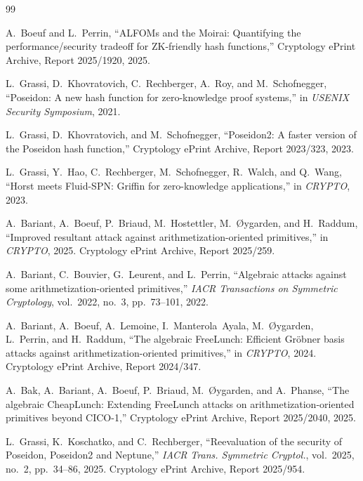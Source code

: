 \documentclass[11pt,a4paper]{article}
\theoremstyle{definition}
\begin{document}
\begin{thebibliography}{99}

A.~Boeuf and L.~Perrin,
``ALFOMs and the Moirai: Quantifying the performance/security tradeoff
for ZK-friendly hash functions,''
Cryptology ePrint Archive, Report 2025/1920, 2025.

L.~Grassi, D.~Khovratovich, C.~Rechberger, A.~Roy, and M.~Schofnegger,
``Poseidon: A new hash function for zero-knowledge proof systems,''
in \emph{USENIX Security Symposium}, 2021.

L.~Grassi, D.~Khovratovich, and M.~Schofnegger,
``Poseidon2: A faster version of the Poseidon hash function,''
Cryptology ePrint Archive, Report 2023/323, 2023.

L.~Grassi, Y.~Hao, C.~Rechberger, M.~Schofnegger, R.~Walch, and Q.~Wang,
``Horst meets Fluid-SPN: Griffin for zero-knowledge applications,''
in \emph{CRYPTO}, 2023.

A.~Bariant, A.~Boeuf, P.~Briaud, M.~Hostettler, M.~{\O}ygarden, and
H.~Raddum,
``Improved resultant attack against arithmetization-oriented
primitives,''
in \emph{CRYPTO}, 2025. Cryptology ePrint Archive, Report 2025/259.

A.~Bariant, C.~Bouvier, G.~Leurent, and L.~Perrin,
``Algebraic attacks against some arithmetization-oriented primitives,''
\emph{IACR Transactions on Symmetric Cryptology}, vol.~2022, no.~3,
pp.~73--101, 2022.

A.~Bariant, A.~Boeuf, A.~Lemoine, I.~Manterola~Ayala, M.~{\O}ygarden,
L.~Perrin, and H.~Raddum,
``The algebraic FreeLunch: Efficient Gr\"obner basis attacks against
arithmetization-oriented primitives,''
in \emph{CRYPTO}, 2024. Cryptology ePrint Archive, Report 2024/347.

A.~Bak, A.~Bariant, A.~Boeuf, P.~Briaud, M.~{\O}ygarden, and
A.~Phanse,
``The algebraic CheapLunch: Extending FreeLunch attacks on
arithmetization-oriented primitives beyond CICO-1,''
Cryptology ePrint Archive, Report 2025/2040, 2025.

L.~Grassi, K.~Koschatko, and C.~Rechberger,
``Reevaluation of the security of Poseidon, Poseidon2 and Neptune,''
\emph{IACR Trans. Symmetric Cryptol.}, vol.~2025, no.~2, pp.~34--86,
2025. Cryptology ePrint Archive, Report 2025/954.


\end{thebibliography}
\end{document}
